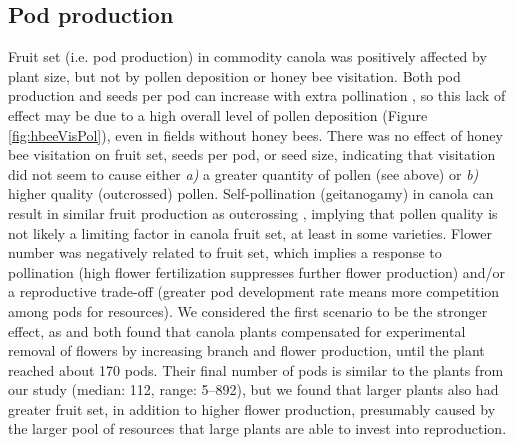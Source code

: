 \documentclass[12pt]{article} %
\begin{document}
\subsection{Pod production} %
Fruit set (i.e. pod production) in commodity canola was positively affected by plant size, but not by pollen deposition or honey bee visitation.
Both pod production and seeds per pod can increase with extra pollination \citep{jauker2008,sabbahi2005,sabbahi2006,duran2010}, so this lack of effect may be due to a high overall level of pollen deposition (Figure \ref{fig:hbeeVisPol}), even in fields without honey bees.
There was no effect of honey bee visitation on fruit set, seeds per pod, or seed size, indicating that visitation did not seem to cause either \textit{a)} a greater quantity of pollen (see above) or \textit{b)} higher quality (outcrossed) pollen.
Self-pollination (geitanogamy) in canola can result in similar fruit production as outcrossing \citep{rosa2011}, implying that pollen quality is not likely a limiting factor in canola fruit set, at least in some varieties.
Flower number was negatively related to fruit set, which implies a response to pollination (high flower fertilization suppresses further flower production) and/or a reproductive trade-off (greater pod development rate means more competition among pods for resources).
We considered the first scenario to be the stronger effect, as \citet{sabbahi2006} and \citet{mesquida1981} both found that canola plants compensated for experimental removal of flowers by increasing branch and flower production, until the plant reached about 170 pods.
Their final number of pods is similar to the plants from our study (median: 112, range: 5--892), but we found that larger plants also had greater fruit set, in addition to higher flower production, presumably caused by the larger pool of resources that large plants are able to invest into reproduction. 
\end{document}
